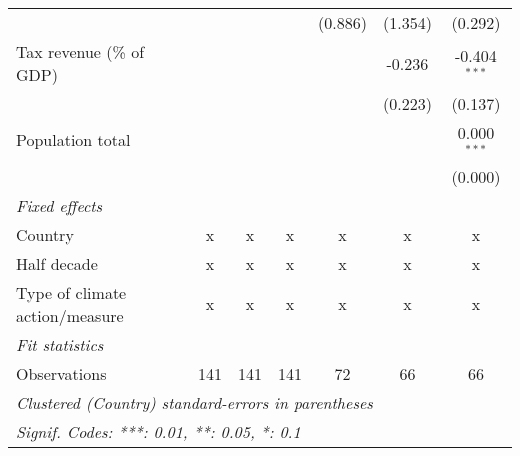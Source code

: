 \begin{tabular}{lcccccc}
                                              &                &                &                & (0.886)        & (1.354)         & (0.292)\\   
   Tax revenue (\% of GDP)                    &                &                &                &                & -0.236          & -0.404$^{***}$\\   
                                              &                &                &                &                & (0.223)         & (0.137)\\   
   Population total                           &                &                &                &                &                 & 0.000$^{***}$\\   
                                              &                &                &                &                &                 & (0.000)\\   
   \emph{Fixed effects}\\
   Country                                    & x              & x              & x              & x              & x               & x\\  
   Half decade                                & x              & x              & x              & x              & x               & x\\  
   Type of climate action/measure             & x              & x              & x              & x              & x               & x\\  
   \midrule \emph{Fit statistics}\\
   Observations                               & 141            & 141            & 141            & 72             & 66              & 66\\  
   \midrule
   \multicolumn{7}{l}{\emph{Clustered (Country) standard-errors in parentheses}}\\
   \multicolumn{7}{l}{\emph{Signif. Codes: ***: 0.01, **: 0.05, *: 0.1}}\\
\end{tabular}
\par\endgroup


